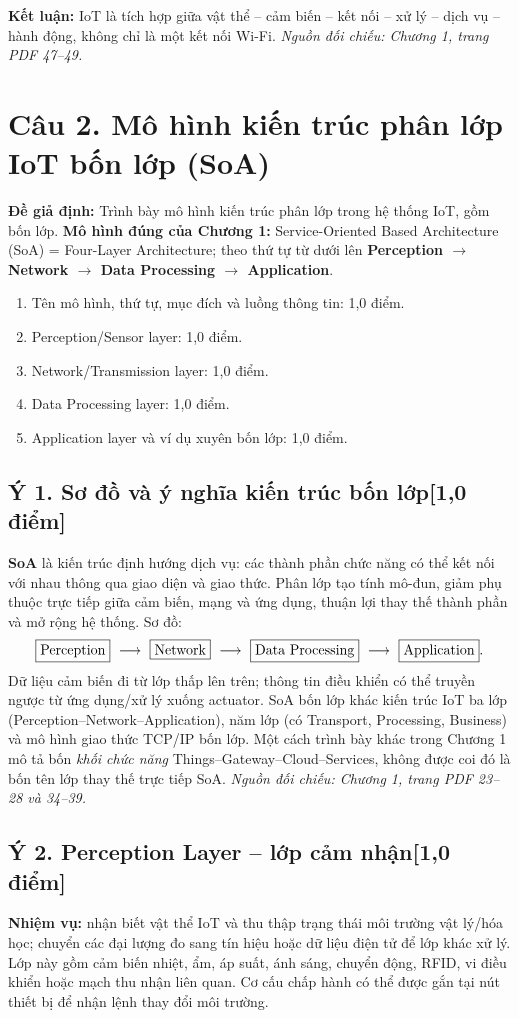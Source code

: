 \documentclass[12pt,a4paper]{article}
\newcommand{\muc}[1]{\subsection*{#1\hfill{\color{teal}\normalsize [1,0 điểm]}}}
\newcommand{\nguon}[1]{{\small\itshape\color{navy}Nguồn đối chiếu: #1.}}
\begin{document}
\textbf{Kết luận:} IoT là tích hợp giữa vật thể -- cảm biến -- kết nối -- xử lý -- dịch vụ -- hành động, không chỉ là một kết nối Wi-Fi. \nguon{Chương 1, trang PDF 47--49}

\newpage
\section{Câu 2. Mô hình kiến trúc phân lớp IoT bốn lớp (SoA)}
\textbf{Đề giả định:} Trình bày mô hình kiến trúc phân lớp trong hệ thống IoT, gồm bốn lớp. \textbf{Mô hình đúng của Chương 1:} Service-Oriented Based Architecture (SoA) = Four-Layer Architecture; theo thứ tự từ dưới lên \textbf{Perception $\to$ Network $\to$ Data Processing $\to$ Application}.

\begin{barem}
\begin{enumerate}
\item Tên mô hình, thứ tự, mục đích và luồng thông tin: 1,0 điểm.
\item Perception/Sensor layer: 1,0 điểm.
\item Network/Transmission layer: 1,0 điểm.
\item Data Processing layer: 1,0 điểm.
\item Application layer và ví dụ xuyên bốn lớp: 1,0 điểm.
\end{enumerate}
\end{barem}

\muc{Ý 1. Sơ đồ và ý nghĩa kiến trúc bốn lớp}
\textbf{SoA} là kiến trúc định hướng dịch vụ: các thành phần chức năng có thể kết nối với nhau thông qua giao diện và giao thức. Phân lớp tạo tính mô-đun, giảm phụ thuộc trực tiếp giữa cảm biến, mạng và ứng dụng, thuận lợi thay thế thành phần và mở rộng hệ thống. Sơ đồ:
\[
\fbox{Perception}\ \longrightarrow\
\fbox{Network}\ \longrightarrow\
\fbox{Data Processing}\ \longrightarrow\
\fbox{Application}.
\]
Dữ liệu cảm biến đi từ lớp thấp lên trên; thông tin điều khiển có thể truyền ngược từ ứng dụng/xử lý xuống actuator. SoA bốn lớp khác kiến trúc IoT ba lớp (Perception--Network--Application), năm lớp (có Transport, Processing, Business) và mô hình giao thức TCP/IP bốn lớp. Một cách trình bày khác trong Chương 1 mô tả bốn \emph{khối chức năng} Things--Gateway--Cloud--Services, không được coi đó là bốn tên lớp thay thế trực tiếp SoA. \nguon{Chương 1, trang PDF 23--28 và 34--39}

\muc{Ý 2. Perception Layer -- lớp cảm nhận}
\textbf{Nhiệm vụ:} nhận biết vật thể IoT và thu thập trạng thái môi trường vật lý/hóa học; chuyển các đại lượng đo sang tín hiệu hoặc dữ liệu điện tử để lớp khác xử lý. Lớp này gồm cảm biến nhiệt, ẩm, áp suất, ánh sáng, chuyển động, RFID, vi điều khiển hoặc mạch thu nhận liên quan. Cơ cấu chấp hành có thể được gắn tại nút thiết bị để nhận lệnh thay đổi môi trường.
\end{document}
